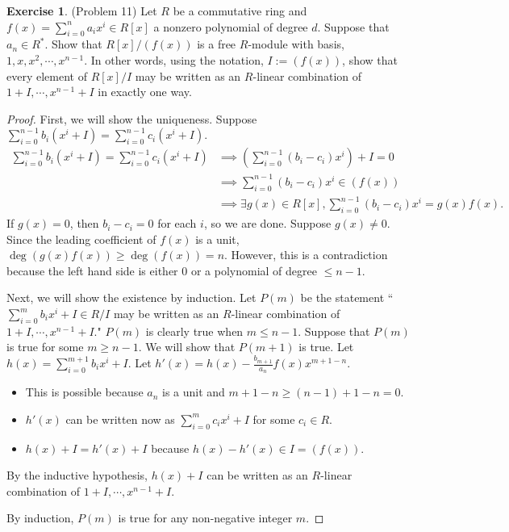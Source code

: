 \documentclass[12pt, psamsfonts]{amsart}
\theoremstyle{definition}
\newtheorem*{exer}{Exercise}
\theoremstyle{remark}
\numberwithin{equation}{section}
\begin{document}
\begin{exer}{(Problem 11)}
  Let $R$ be a commutative ring and $f(x) = \sum_{i=0}^{n} a_ix^i \in R[x]$ a nonzero polynomial of degree $d$.
  Suppose that $a_n \in R^*$.
  Show that $R[x]/(f(x))$ is a free $R$-module with basis, $1, x, x^2, \cdots, x^{n - 1}$.
  In other words, using the notation, $I := (f(x))$, show that every element of $R[x]/I$ may be written as an $R$-linear combination of $1 + I, \cdots, x^{n - 1} + I$ in exactly one way.
\end{exer}

\begin{proof}
  First, we will show the uniqueness.
  Suppose $\sum_{i=0}^{n-1} b_i(x^i + I) = \sum_{i=0}^{n-1} c_i(x^i + I)$.
  \begin{align*}
    \sum_{i=0}^{n-1} b_i(x^i + I) = \sum_{i=0}^{n-1} c_i(x^i + I)
      &\implies (\sum_{i=0}^{n-1} (b_i - c_i)x^i) + I = 0 \\
      &\implies \sum_{i=0}^{n-1} (b_i - c_i)x^i \in (f(x)) \\
      &\implies \exists g(x) \in R[x], \sum_{i=0}^{n-1} (b_i - c_i)x^i = g(x)f(x).
  \end{align*}
  If $g(x) = 0$, then $b_i - c_i = 0$ for each $i$, so we are done.
  Suppose $g(x) \ne 0$.
  Since the leading coefficient of $f(x)$ is a unit, $\deg(g(x)f(x)) \geq \deg(f(x)) = n$.
  However, this is a contradiction because the left hand side is either 0 or a polynomial of degree $\leq n - 1$.

  Next, we will show the existence by induction.
  Let $P(m)$ be the statement ``$\sum_{i=0}^{m} b_ix^i + I \in R/I$ may be written as an $R$-linear combination of $1 + I, \cdots, x^{n - 1} + I$."
  $P(m)$ is clearly true when $m \leq n - 1$.
  Suppose that $P(m)$ is true for some $m \geq n - 1$.
  We will show that $P(m + 1)$ is true.
  Let $h(x) = \sum_{i=0}^{m+1} b_ix^i + I$.
  Let $h'(x) = h(x) - \frac{b_{m + 1}}{a_n}f(x)x^{m + 1 - n}$.
  \begin{itemize}
    \item
      This is possible because $a_n$ is a unit and $m + 1 - n \geq (n - 1) + 1 - n = 0$.
    \item
      $h'(x)$ can be written now as $\sum_{i=0}^{m} c_ix^i + I$ for some $c_i \in R$.
    \item
      $h(x) + I = h'(x) + I$ because $h(x) - h'(x) \in I = (f(x))$.
  \end{itemize}
  By the inductive hypothesis, $h(x) + I$ can be written as an $R$-linear combination of $1 + I, \cdots, x^{n - 1} + I$.

  By induction, $P(m)$ is true for any non-negative integer $m$.
\end{proof}
\end{document}
